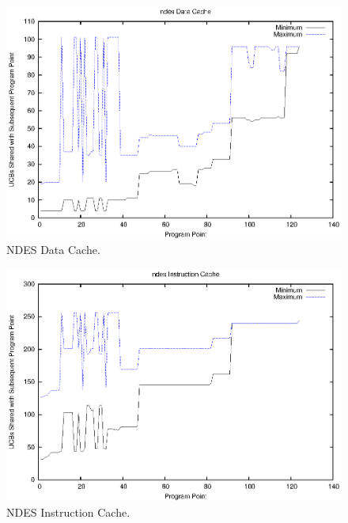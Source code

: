 \begin{figure}[h!]
\begin{center}
\includegraphics[width=\linewidth]{eps/ndes-dcache.eps}
\caption{NDES Data Cache.}
\label{fig:ndes_data_cache}
\end{center}
\end{figure}
%
\vspace{-20pt}
\begin{figure}[h!]
\begin{center}
\includegraphics[width=\linewidth]{eps/ndes-icache.eps}
\caption{NDES Instruction Cache.}
\label{fig:ndes_instruction_cache}
\end{center}
\end{figure}
% 